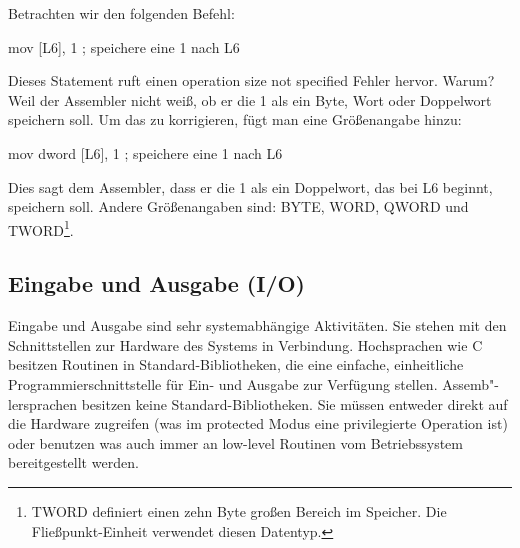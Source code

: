 Betrachten wir den folgenden Befehl:
\begin{AsmCodeListing}[frame=none, numbers=left, firstnumber=last]
      mov    [L6], 1        ; speichere eine 1 nach L6
\end{AsmCodeListing}
Dieses Statement ruft einen {\code operation size not specified}
Fehler hervor. Warum? Weil der Assembler nicht wei{\ss}, ob er die 1 als
ein Byte, Wort oder Doppelwort speichern soll. Um das zu
korrigieren, f\"{u}gt man eine Gr\"{o}{\ss}enangabe hinzu:
\begin{AsmCodeListing}[frame=none, numbers=left, firstnumber=last]
      mov    dword [L6], 1  ; speichere eine 1 nach L6
\end{AsmCodeListing}
Dies sagt dem Assembler, dass er die 1 als ein
Doppelwort, das bei {\code L6} beginnt, speichern soll. Andere
Gr\"{o}{\ss}enangaben sind: {\code BYTE},  {\code WORD},
 {\code QWORD}  und  {\code
TWORD}\footnote{{\code TWORD} definiert einen zehn Byte gro{\ss}en
Bereich im Speicher. Die Flie{\ss}punkt-Einheit verwendet diesen
Datentyp.}. 

\subsection{Eingabe und Ausgabe (I/O)}

Eingabe und Ausgabe sind sehr systemabh\"{a}ngige Aktivit\"{a}ten. Sie
stehen mit den Schnittstellen zur Hardware des Systems in
Verbindung. Hochsprachen wie C besitzen Routinen in
Standard-Bibliotheken, die eine einfache, einheitliche
Programmierschnittstelle f\"{u}r Ein- und Ausgabe zur Verf\"{u}gung stellen.
Assemb"-lersprachen besitzen keine Standard-Bibliotheken. Sie m\"{u}ssen
entweder direkt auf die Hardware zugreifen (was im protected Modus
eine privilegierte Operation ist) oder benutzen was auch immer an
low-level Routinen vom Betriebssystem bereitgestellt werden.

